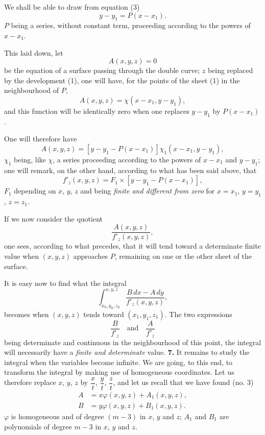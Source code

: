 \documentclass{article}
\begin{document}
We shall be able to draw from equation (3)
\[
y - y_{1} = P(x - x_{1}).
\]
$P$ being a series, without constant term, proceeding according to the powers of $x - x_{1}$.

This laid down, let
\[
A(x, y, z) = 0
\]
be the equation of a surface passing through the double curve; $z$ being replaced
by the development (1), one will have, for the points of the sheet (1) in the neighbourhood of $P$,
\[
A(x, y, z) = \chi(x - x_{1}, y - y_{1}),
\]
and this function will be identically zero when one replaces $y - y_{1}$ by $P(x - x_{1})$.

One will therefore have
\[
A(x, y, z) = [y - y_{1} - P(x - x_{1})]\chi_{1}(x - x_{1}, y - y_{1}),
\]
$\chi_{1}$ being, like $\chi$, a series proceeding according to the powers of $x - x_{1}$ and $y - y_{1}$; one will remark, on the other hand, according to what has been said above, that
\[
f'_{z}(x, y, z) = F_{1} \times [y - y_{1} - P(x - x_{1})],
\]
$F_{1}$ depending on $x$, $y$, $z$ and being \emph{finite and different from zero} for $x = x_{1}$, $y = y_{1}$, $z = z_{1}$.

If we now consider the quotient
\[
\frac{A(x, y, z)}{f'_{z}(x, y, z)},
\]
one sees, according to what precedes, that it will tend toward a determinate finite value when $(x, y, z)$ approaches $P$, remaining on one or the other sheet of the surface.

It is easy now to find what the integral
\[
\int_{x_{0}, y_{0}, z_{0}}^{x, y, z} \frac{B\,dx - A\,dy}{f'_{z}(x, y, z)},
\]
becomes when $(x, y, z)$ tends toward $(x_{1}, y_{1}, z_{1})$. The two expressions
\[
\frac{B}{f'_{z}} \quad \text{and} \quad \frac{A}{f'_{z}}
\]
being determinate and continuous in the neighbourhood of this point, the integral will necessarily have a \emph{finite and determinate} value.
\textbf{7.} It remains to study the integral when the variables become infinite. We are going, to this end, to transform the integral by making use of homogeneous coordinates. Let us therefore replace $x$, $y$, $z$ by $\dfrac{x}{t}$, $\dfrac{y}{t}$, $\dfrac{z}{t}$, and let us recall that we have found (no. 3)
\[
\begin{aligned}
A &= x\varphi(x, y, z) + A_{1}(x, y, z), \\
B &= y\varphi(x, y, z) + B_{1}(x, y, z).
\end{aligned}
\]
$\varphi$ is homogeneous and of degree $(m - 3)$ in $x$, $y$ and $z$; $A_{1}$ and $B_{1}$ are polynomials of degree $m - 3$ in $x$, $y$ and $z$.
\end{document}

